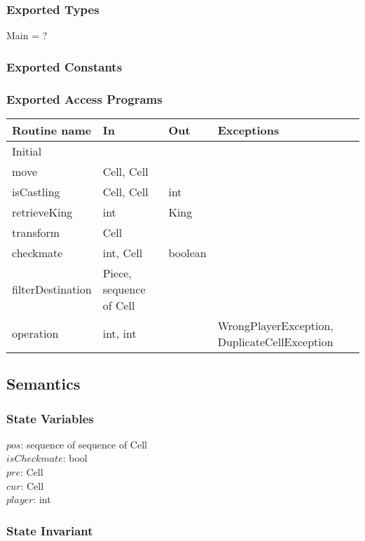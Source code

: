 \documentclass[12pt]{article}
\begin{document}
\subsubsection* {Exported Types}
Main = ?

\subsubsection* {Exported Constants}

\subsubsection* {Exported Access Programs}

\begin{tabular}{| l | l | l | p{5cm} |}
\hline
\textbf{Routine name} & \textbf{In} & \textbf{Out} & \textbf{Exceptions}\\
\hline
Initial & ~ & ~ & ~\\
\hline
move & Cell, Cell & ~ & ~\\
\hline
isCastling & Cell, Cell & int & ~\\
\hline
retrieveKing & int & King & ~\\
\hline
transform & Cell & ~ & ~\\
\hline
checkmate & int, Cell & boolean & ~\\
\hline
filterDestination & Piece, sequence of Cell & ~ & ~\\
\hline
operation & int, int & ~ & WrongPlayerException, DuplicateCellException\\
\hline


\end{tabular}

\subsection* {Semantics}

\subsubsection* {State Variables}

$pos$: sequence of sequence of Cell\\
$isCheckmate$: bool\\
$pre$: Cell\\
$cur$: Cell\\
$player$: int

\subsubsection* {State Invariant}
\end{document}

